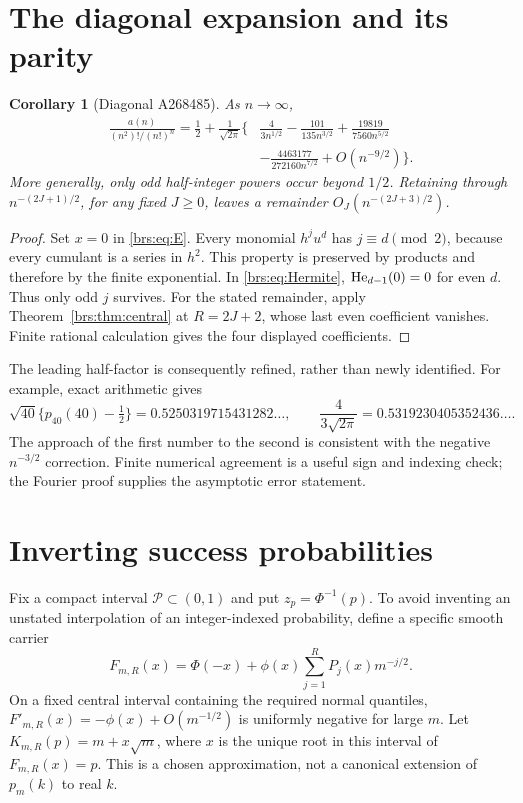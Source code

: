 \documentclass[11pt]{article}
\numberwithin{equation}{section}
\newtheorem{corollary}[theorem]{Corollary}
\theoremstyle{remark}\newtheorem{remark}[theorem]{Remark}
\begin{document}
\section{The diagonal expansion and its parity}

\begin{corollary}[Diagonal A268485]\label{brs:cor:diagonal}
As $n\to\infty$,
\begin{align}\label{brs:eq:diagonal}
 \frac{a(n)}{(n^2)!/(n!)^n}
 =\frac12+\frac1{\sqrt{2\pi}}\bigg\{
 &\frac4{3n^{1/2}}-\frac{101}{135n^{3/2}}
 +\frac{19819}{7560n^{5/2}}\\
 &-\frac{4463177}{272160n^{7/2}}+O(n^{-9/2})\bigg\}.\nonumber
\end{align}
More generally, only odd half-integer powers occur beyond $1/2$.
Retaining through $n^{-(2J+1)/2}$, for any fixed $J\geq0$, leaves a
remainder $O_J(n^{-(2J+3)/2})$.
\end{corollary}
\begin{proof}
Set $x=0$ in \eqref{brs:eq:E}.  Every monomial $h^ju^d$ has $j\equiv d\pmod2$,
because every cumulant is a series in $h^2$.  This property is preserved
by products and therefore by the finite exponential.  In
\eqref{brs:eq:Hermite}, $\operatorname{He}_{d-1}(0)=0$ for even $d$.  Thus only odd $j$
survives.  For the stated remainder, apply Theorem~\ref{brs:thm:central} at
$R=2J+2$, whose last even coefficient vanishes.  Finite rational
calculation gives the four displayed coefficients.
\end{proof}

The leading half-factor is consequently refined, rather than newly
identified.  For example, exact arithmetic gives
\[
 \sqrt{40}\{p_{40}(40)-\tfrac12\}=0.5250319715431282\ldots,
 \qquad \frac4{3\sqrt{2\pi}}=0.5319230405352436\ldots.
\]
The approach of the first number to the second is consistent with the
negative $n^{-3/2}$ correction.  Finite numerical agreement is a useful
sign and indexing check; the Fourier proof supplies the asymptotic error
statement.

\section{Inverting success probabilities}

Fix a compact interval $\mathcal P\subset(0,1)$ and put
$z_p=\Phi^{-1}(p)$.  To avoid inventing an unstated interpolation of an
integer-indexed probability, define a specific smooth carrier
\[
 F_{m,R}(x)=\Phi(-x)+\phi(x)\sum_{j=1}^R P_j(x)m^{-j/2}.
\]
On a fixed central interval containing the required normal quantiles,
$F'_{m,R}(x)=-\phi(x)+O(m^{-1/2})$ is uniformly negative for large $m$.
Let $K_{m,R}(p)=m+x\sqrt m$, where $x$ is the unique root in this interval
of $F_{m,R}(x)=p$.  This is a chosen approximation, not a canonical
extension of $p_m(k)$ to real $k$.
\end{document}
